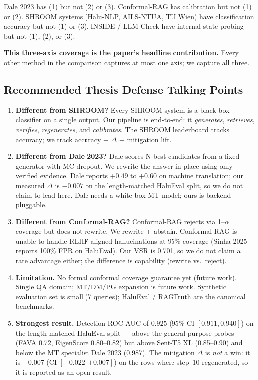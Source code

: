Dale 2023 has (1) but not (2) or (3). Conformal-RAG has calibration but not
(1) or (2). SHROOM systems (Halu-NLP, AILS-NTUA, TU Wien) have classification
accuracy but not (1) or (3). INSIDE / LLM-Check have internal-state probing
but not (1), (2), or (3).

\textbf{This three-axis coverage is the paper's headline contribution.} Every
other method in the comparison captures at most one axis; we capture all
three.

\subsection{Recommended Thesis Defense Talking Points}
\label{sec:defense-points}

\begin{enumerate}
    \item \textbf{Different from SHROOM?} Every SHROOM system is a black-box
          classifier on a single output. Our pipeline is end-to-end: it
          \emph{generates}, \emph{retrieves}, \emph{verifies},
          \emph{regenerates}, and \emph{calibrates}. The SHROOM leaderboard
          tracks accuracy; we track accuracy + $\Delta$ + mitigation lift.

    \item \textbf{Different from Dale 2023?} Dale scores N-best candidates
          from a fixed generator with MC-dropout. We rewrite the answer in
          place using only verified evidence. Dale reports $+0.49$ to $+0.60$
          on machine translation; our measured $\Delta$ is $-0.007$ on the length-matched HaluEval split, so we do not claim to lead here. Dale
          needs a white-box MT model; ours is backend-pluggable.

    \item \textbf{Different from Conformal-RAG?} Conformal-RAG rejects via
          1--$\alpha$ coverage but does not rewrite. We rewrite + abstain.
          Conformal-RAG is unable to handle RLHF-aligned hallucinations at
          95\% coverage (Sinha 2025 reports 100\% FPR on HaluEval). Our VSR
          is 0.701, so we do not claim a rate advantage either; the difference
          is capability (rewrite vs.\ reject).

    \item \textbf{Limitation.} No formal conformal coverage guarantee yet
          (future work). Single QA domain; MT/DM/PG expansion is future
          work. Synthetic evaluation set is small (7 queries); HaluEval /
          RAGTruth are the canonical benchmarks.

    \item \textbf{Strongest result.} Detection ROC-AUC of $0.925$
          (95\% CI $[0.911, 0.940]$) on the length-matched HaluEval
          split --- above the general-purpose probes (FAVA 0.72,
          EigenScore 0.80--0.82) but above Sent-T5 XL (0.85--0.90) and
          below the MT specialist Dale 2023 (0.987). The mitigation
          $\Delta$ is \emph{not} a win: it is $-0.007$ (CI $[-0.022,
          +0.007]$) on the rows where step~10 regenerated, so it is
          reported as an open result.
\end{enumerate}

